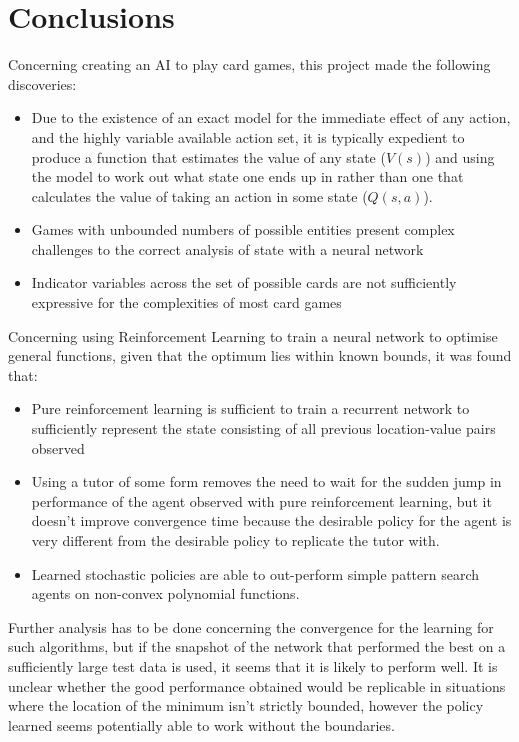 \section{Conclusions}
Concerning creating an AI to play card games, this project made the following discoveries:
\begin{itemize}
\item Due to the existence of an exact model for the immediate effect of any action, and the highly variable available action set, it is typically expedient to produce a function that estimates the value of any state ($V(s)$) and using the model to work out what state one ends up in rather than one that calculates the value of taking an action in some state ($Q(s,a)$).
\item Games with unbounded numbers of possible entities present complex challenges to the correct analysis of state with a neural network 
\item Indicator variables across the set of possible cards are not sufficiently expressive for the complexities of most card games
\end{itemize}



Concerning using Reinforcement Learning to train a  neural network to optimise general functions, given that the optimum lies within known bounds, it was found that:
\begin{itemize}
\item Pure reinforcement learning is sufficient to train a recurrent network to sufficiently represent the state consisting of all previous location-value pairs observed
\item Using a tutor of some form removes the need to wait for the sudden jump in performance of the agent observed with pure reinforcement learning, but it doesn't improve convergence time because the desirable policy for the agent is very different from the desirable policy to replicate the tutor with.
\item Learned stochastic policies are able to out-perform simple pattern search agents on non-convex polynomial functions.
\end{itemize}
Further analysis has to be done concerning the convergence for the learning for such algorithms, but if the snapshot of the network that performed the best on a sufficiently large test data is used, it seems that it is likely to perform well. It is unclear whether the good performance obtained would be replicable in situations where the location of the minimum isn't strictly bounded, however the policy learned seems potentially able to work without the boundaries.

